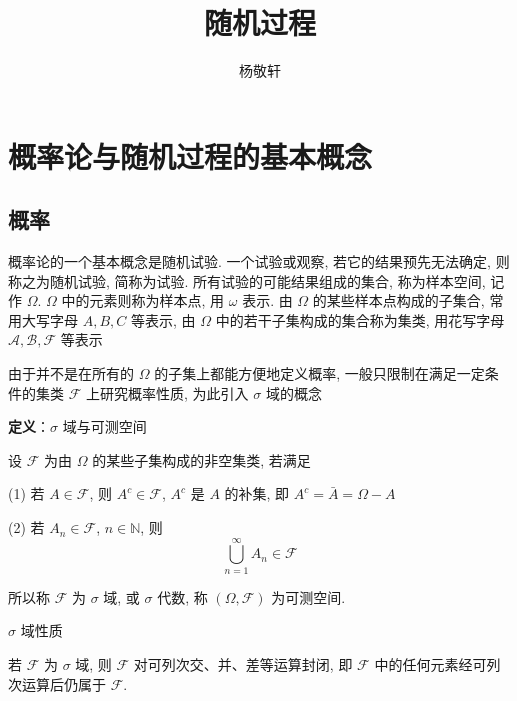 \documentclass[openany]{ctexbook}
\theoremstyle{kaiti}
\theoremstyle{normal}
\begin{document}
\title{\heiti \Huge 随机过程 \vspace{0.5cm}}
\author{\LARGE\kaishu 杨敬轩 \vspace{1cm}}

\maketitle
\thispagestyle{empty}

\frontmatter

\tableofcontents

\mainmatter

\chapter{概率论与随机过程的基本概念}

\section{概率}

概率论的一个基本概念是随机试验. 一个试验或观察, 若它的结果预先无法确定, 则称之为随机试验, 简称为试验. 所有试验的可能结果组成的集合, 称为样本空间, 记作 $\Omega$. $\Omega$ 中的元素则称为样本点, 用 $\omega$ 表示. 由 $\Omega$ 的某些样本点构成的子集合, 常用大写字母 $A,B,C$ 等表示, 由 $\Omega$ 中的若干子集构成的集合称为集类, 用花写字母 $\mathcal{A},\mathcal{B},\mathcal{F}$ 等表示

由于并不是在所有的 $\Omega$ 的子集上都能方便地定义概率, 一般只限制在满足一定条件的集类 $\mathcal{F}$ 上研究概率性质, 为此引入 $\sigma$ 域的概念

\textbf{定义}：$\sigma$ 域与可测空间

设 $\mathcal{F}$ 为由 $\Omega$ 的某些子集构成的非空集类, 若满足

(1) 若 $A\in\mathcal{F}$, 则 $A^c\in\mathcal{F}$, $A^c$ 是 $A$ 的补集, 即 $A^c=\bar{A}=\Omega-A$

(2) 若 $A_n\in\mathcal{F}$, $n\in\mathbb{N}$, 则
\begin{equation}
  \bigcup_{n=1}^\infty A_n\in\mathcal{F}
\end{equation}

所以称 $\mathcal{F}$ 为 $\sigma$ 域, 或 $\sigma$ 代数,  称 $(\Omega,\mathcal{F})$ 为可测空间.

$\sigma$ 域性质

若 $\mathcal{F}$ 为 $\sigma$ 域, 则 $\mathcal{F}$ 对可列次交、并、差等运算封闭, 即 $\mathcal{F}$ 中的任何元素经可列次运算后仍属于 $\mathcal{F}$.
\end{document}
